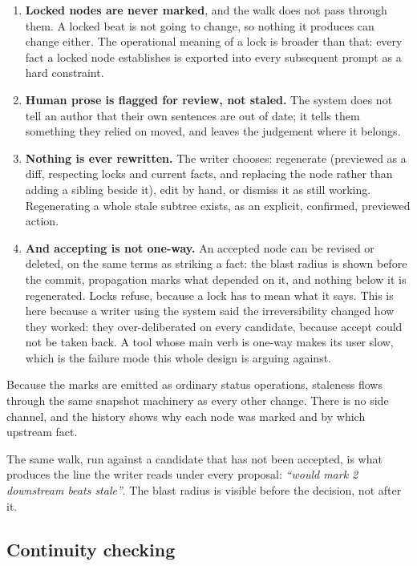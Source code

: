 \documentclass{article}
\begin{document}
\begin{enumerate}[label=\arabic*.]
\item \textbf{Locked nodes are never marked}, and the walk does not pass through them. A
locked beat is not going to change, so nothing it produces can change either. The
operational meaning of a lock is broader than that: every fact a locked node establishes
is exported into every subsequent prompt as a hard constraint.
\item \textbf{Human prose is flagged for review, not staled.} The system does not tell an
author that their own sentences are out of date; it tells them something they relied on
moved, and leaves the judgement where it belongs.
\item \textbf{Nothing is ever rewritten.} The writer chooses: regenerate (previewed as a
diff, respecting locks and current facts, and replacing the node rather than adding a sibling
beside it), edit by hand, or dismiss it as still working. Regenerating a whole stale
subtree exists, as an explicit, confirmed, previewed action.
\item \textbf{And accepting is not one-way.} An accepted node can be revised or deleted, on
the same terms as striking a fact: the blast radius is shown before the commit, propagation
marks what depended on it, and nothing below it is regenerated. Locks refuse, because a lock
has to mean what it says. This is here because a writer using the system said the
irreversibility changed how they worked: they over-deliberated on every candidate, because
accept could not be taken back. A tool whose main verb is one-way makes its user slow, which
is the failure mode this whole design is arguing against.
\end{enumerate}

Because the marks are emitted as ordinary status operations, staleness flows through the
same snapshot machinery as every other change. There is no side channel, and the history
shows why each node was marked and by which upstream fact.

The same walk, run against a candidate that has not been accepted, is what produces the
line the writer reads under every proposal: \emph{``would mark 2 downstream beats
stale''}. The blast radius is visible before the decision, not after it.


\subsection{Continuity checking}
\label{sec:continuity}
\end{document}
